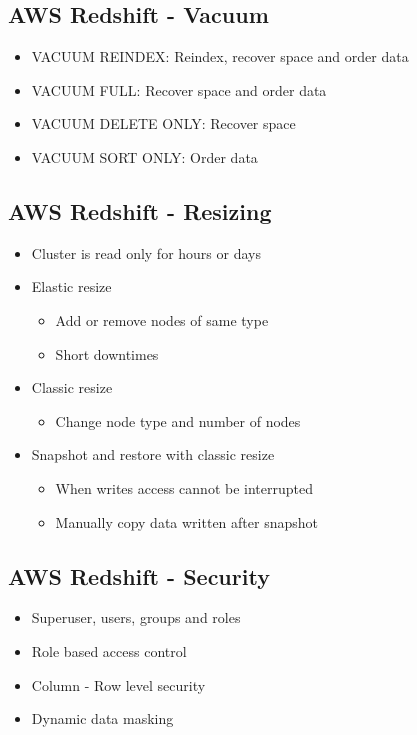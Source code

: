 \documentclass[../main.tex]{subfiles}
\begin{document}
\subsection{AWS Redshift - Vacuum}
\begin{itemize}
    \item VACUUM REINDEX: Reindex, recover space and order data
    \item VACUUM FULL: Recover space and order data
    \item VACUUM DELETE ONLY: Recover space
    \item VACUUM SORT ONLY: Order data
\end{itemize}

\subsection{AWS Redshift - Resizing}
\begin{itemize}
    \item Cluster is read only for hours or days
    \item Elastic resize
    \begin{itemize}
        \item Add or remove nodes of same type
        \item Short downtimes
    \end{itemize}
    \item Classic resize
    \begin{itemize}
        \item Change node type and number of nodes
    \end{itemize}
    \item Snapshot and restore with classic resize
    \begin{itemize}
        \item When writes access cannot be interrupted
        \item Manually copy data written after snapshot
    \end{itemize}
\end{itemize}

\subsection{AWS Redshift - Security}
\begin{itemize}
    \item Superuser, users, groups and roles
    \item Role based access control
    \item Column - Row level security
    \item Dynamic data masking
\end{itemize}
\end{document}
